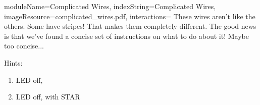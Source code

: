 \documentclass{../../ktane-mod}
\begin{document}
\begin{module}{
  moduleName=Complicated Wires,
  indexString=Complicated Wires,
  imageResource=complicated_wires.pdf,
  interactions=\keysymbol
}
{
  \sloppy
  These wires aren't like the others. Some have stripes! That makes them completely different. The good news is that we've found a concise set of instructions on what to do about it! Maybe too concise...
}

\newlength{\cellwidth}
\newlength{\cellheight}
\newlength{\cellheightwithoutpadding}
\setlength{\cellwidth}{1cm}
\setlength{\cellheight}{1.13cm}
\setlength{\cellheightwithoutpadding}{1cm}
\newlength{\lastcellwidth}
\setlength{\lastcellwidth}{2.1cm}
\newlength{\fivecellwidth}
\setlength{\fivecellwidth}{5.69cm}
\newlength{\twocellheight}
\setlength{\twocellheight}{2\cellheight}
\newlength{\circleoffset}
\setlength{\circleoffset}{0.20\cellwidth}
\newlength{\staroffset}
\setlength{\staroffset}{0.05\cellwidth}
\newlength{\tablelinewidth}
\setlength{\tablelinewidth}{1pt}

\begin{bulletlist}
\end{bulletlist}

Hints:
\begin{bulletlist}
\end{bulletlist}

\vspace{2cm}

\begin{minipage}[t]{0.48\textwidth}
\begin{enumerate}
  \renewcommand{\labelenumi}{\alph{enumi}.}
  \item LED off, 
  \item LED off, \RED with STAR
\end{enumerate}

\vspace{0.5cm}


\end{minipage}
\end{module}
\end{document}
